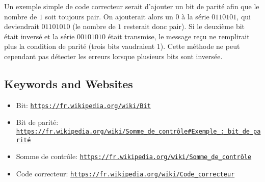 \documentclass[a4paper,11pt]{report}
\newcommand{\BrochureUrlText}[1]{\texttt{#1}}
\begin{document}
Un exemple simple de code correcteur serait d’ajouter un bit de parité afin que le nombre de $1$ soit toujours pair. On ajouterait alors un $0$ à la série $0110101$, qui deviendrait $01101010$ (le nombre de $1$ resterait donc pair). Si le deuxième bit était inversé et la série $00101010$ était transmise, le message reçu ne remplirait plus la condition de parité (trois bits vaudraient $1$). Cette méthode ne peut cependant pas détecter les erreurs lorsque plusieurs bits sont inversée.

{\raggedright

\subsection*{Keywords and Websites}

\begin{itemize}
  \item Bit: \href{https://fr.wikipedia.org/wiki/Bit}{\BrochureUrlText{https://fr.wikipedia.org/wiki/Bit}}
  \item Bit de parité: \href{https://fr.wikipedia.org/wiki/Somme_de_contr\%C3\%B4le\#Exemple_:_bit_de_parit\%C3\%A9}{\BrochureUrlText{https://fr.wikipedia.org/wiki/Somme\_de\_contrôle\#Exemple\_:\_bit\_de\_parité}}
  \item Somme de contrôle: \href{https://fr.wikipedia.org/wiki/Somme_de_contr\%C3\%B4le}{\BrochureUrlText{https://fr.wikipedia.org/wiki/Somme\_de\_contrôle}}
  \item Code correcteur: \href{https://fr.wikipedia.org/wiki/Code_correcteur}{\BrochureUrlText{https://fr.wikipedia.org/wiki/Code\_correcteur}}
\end{itemize}


}
\end{document}
